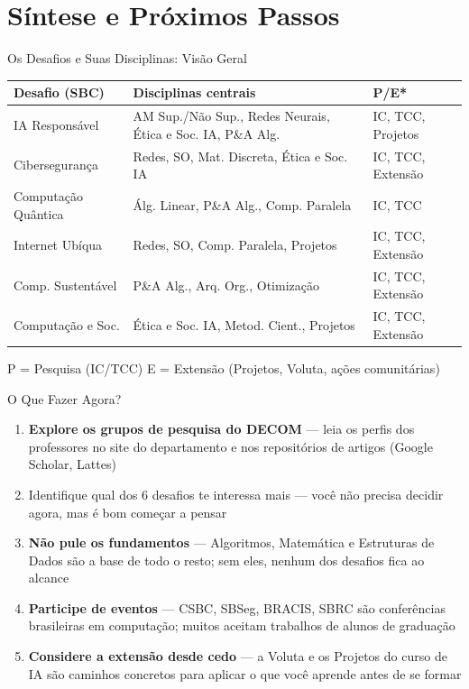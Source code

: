 \documentclass[aspectratio=169]{beamer}
\newcommand{\impt}[1]{\textcolor{morange}{\textbf{#1}}}
\newcommand{\ntc}[1]{\textcolor{mblue}{#1}}
\begin{document}
\section{Síntese e Próximos Passos}

\begin{frame}{Os Desafios e Suas Disciplinas: Visão Geral}
  \vspace{0.1cm}
  \renewcommand{\arraystretch}{1.3}
  \small
  \begin{tabular}{p{3.8cm}p{5.4cm}p{3.4cm}}
    \toprule
    \textbf{Desafio (SBC)} & \textbf{Disciplinas centrais} & \textbf{P/E*} \\
    \midrule
    \colorbox{dsfai}{IA Responsável}        & AM Sup./Não Sup., Redes Neurais, Ética e Soc. IA, P\&A Alg. & IC, TCC, Projetos \\
    \colorbox{dsfcib}{Cibersegurança}       & Redes, SO, Mat. Discreta, Ética e Soc. IA & IC, TCC, Extensão \\
    \colorbox{dsfqua}{Computação Quântica}  & Álg. Linear, P\&A Alg., Comp. Paralela & IC, TCC \\
    \colorbox{dsfnet}{Internet Ubíqua}      & Redes, SO, Comp. Paralela, Projetos & IC, TCC, Extensão \\
    \colorbox{dsfsus}{Comp. Sustentável}    & P\&A Alg., Arq. Org., Otimização & IC, TCC, Extensão \\
    \colorbox{dsfsoc}{Computação e Soc.}    & Ética e Soc. IA, Metod. Cient., Projetos & IC, TCC, Extensão \\
    \bottomrule
  \end{tabular}
  \vspace{0.2cm}

  {\footnotesize *P = Pesquisa (IC/TCC) \quad E = Extensão (Projetos, Voluta, ações comunitárias)}
\end{frame}

\begin{frame}{O Que Fazer Agora?}
  \begin{enumerate}\setlength\itemsep{6pt}
    \item \impt{Explore os grupos de pesquisa do DECOM} --- leia os perfis dos professores no site do departamento e nos repositórios de artigos (Google Scholar, Lattes)
    \item \ntc{Identifique qual dos 6 desafios te interessa mais} --- você não precisa decidir agora, mas é bom começar a pensar
    \item \textbf{Não pule os fundamentos} --- Algoritmos, Matemática e Estruturas de Dados são a base de todo o resto; sem eles, nenhum dos desafios fica ao alcance
    \item \textbf{Participe de eventos} --- CSBC, SBSeg, BRACIS, SBRC são conferências brasileiras em computação; muitos aceitam trabalhos de alunos de graduação
    \item \textbf{Considere a extensão desde cedo} --- a Voluta e os Projetos do curso de IA são caminhos concretos para aplicar o que você aprende antes de se formar
  \end{enumerate}
\end{frame}
\end{document}
